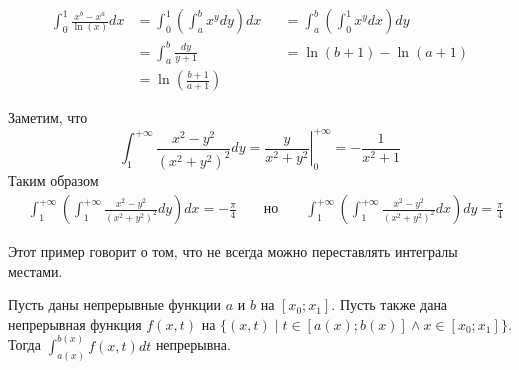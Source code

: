 \documentclass[12pt,a4paper]{article}
\begin{document}
    \begin{example}
        \begin{align*}
            \int_0^1 \frac{x^b - x^a}{\ln(x)} dx
            &= \int_0^1 \left(\int_a^b x^y dy\right) dx&
            &= \int_a^b \left(\int_0^1 x^y dx\right) dy\\
            &= \int_a^b \frac{dy}{y+1}&
            &= \ln(b+1) - \ln(a+1)\\
            &= \ln\left(\frac{b+1}{a+1}\right)
        \end{align*}
    \end{example}

    \begin{example}
        Заметим, что
        \[
            \int_1^{+\infty} \frac{x^2 - y^2}{(x^2 + y^2)^2} dy
            = \left. \frac{y}{x^2 + y^2} \right|_0^{+\infty}
            = - \frac{1}{x^2 + 1}
        \]
        Таким образом
        \begin{align*}
            &\int_1^{+\infty} \left(\int_1^{+\infty} \frac{x^2 - y^2}{(x^2 + y^2)^2} dy\right) dx = -\frac{\pi}{4}&
            &\text{ но }&
            &\int_1^{+\infty} \left(\int_1^{+\infty} \frac{x^2 - y^2}{(x^2 + y^2)^2} dx\right) dy = \frac{\pi}{4}
        \end{align*}
    \end{example}

    \begin{remark*}
        Этот пример говорит о том, что не всегда можно переставлять интегралы местами.
    \end{remark*}

    \begin{theorem}
        Пусть даны непрерывные функции $a$ и $b$ на $[x_0; x_1]$. Пусть также дана непрерывная функция $f(x, t)$ на $\{(x, t) \mid t \in [a(x); b(x)] \wedge x \in [x_0; x_1]\}$. Тогда $\int_{a(x)}^{b(x)} f(x, t) dt$ непрерывна.
    \end{theorem}
\end{document}

